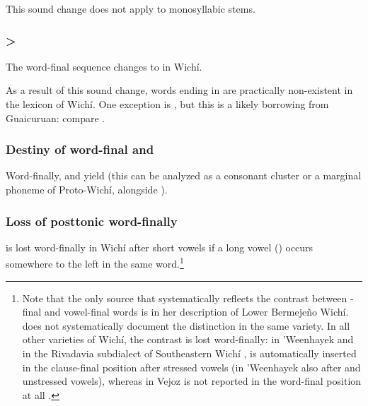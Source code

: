 This sound change does not apply to monosyllabic stems.

\begin{exe}
    \ex \penisits
    \ex \bellyits
    \ex \juiceits
\end{exe}

\subsubsection{ > } \label{wi-nv-nvh}
The word-final sequence  changes to  in Wichí.

\begin{exe}
    \ex \chaniarf
    \ex \whitequebracho
    \ex \redbrocket
    \ex \balawasp
\end{exe}

As a result of this sound change, words ending in  are practically non-existent in the lexicon of Wichí. One exception is , but this is a likely borrowing from Guaicuruan: compare  \citep[263]{CM09}.

\subsubsection{Destiny of word-final  and } \label{wi-l-lh}

Word-finally,  and  yield  (this can be analyzed as a consonant cluster or a marginal phoneme of Proto-Wichí, alongside ).

\begin{exe}
    \ex \brightness
    \ex \diecw
    \ex \returnth
    \ex \tell
    \ex \locustcw
    \ex \pll
    \ex \returnh
    \ex \shadow
\end{exe}

\subsubsection{Loss of posttonic  word-finally}\label{wi-posttonic-deglottalization}

 is lost word-finally in Wichí after short vowels if a long vowel () occurs somewhere to the left in the same word.\footnote{Note that the only source that systematically reflects the contrast between \mbox{-}final and vowel-final words is \citet{VN14} in her description of Lower Bermejeño Wichí. \citet{JB09} does not systematically document the distinction in the same variety. In all other varieties of Wichí, the contrast is lost word-finally: in 'Weenhayek \citep[25]{KC94} and in the Rivadavia subdialect of Southeastern Wichí \citep[31–34]{JT09-th},  is automatically inserted in the clause-final position after stressed vowels (in 'Weenhayek also after  and unstressed vowels), whereas in Vejoz  is not reported in the word-final position at all \citep{VU74,MG-MELO15}.}

